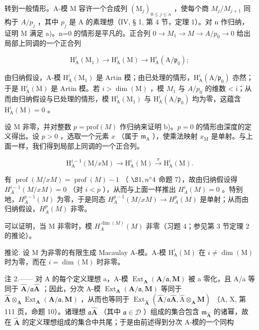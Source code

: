 转到一般情形。A-模 M 容许一个合成列 \((\mathrm{M}_{j})_{0\leqslant j\leqslant n}\) ，使每个商 \(M_{j}/M_{j+1}\) 同构于 \(A/p_{j}\) ，其中 \(p_{j}\) 是 A 的素理想（IV, § 1, 第 4 节，定理 1）。对 n 作归纳，证明 M 满足 a)。n=0 的情形是平凡的。正合列 \(0\to M_{1}\to M\to A/p_{0}\to0\) 给出局部上同调的一个正合列

\[
\mathrm{H} _ {\mathrm{A}} ^ {i} \left(\mathrm{M} _ {1}\right) \longrightarrow \mathrm{H} _ {\mathrm{A}} ^ {i} (\mathrm{M}) \longrightarrow \mathrm{H} _ {\mathrm{A}} ^ {i} \left(\mathrm{A} / \mathfrak {p} _ {0}\right);
\]

由归纳假设，A-模 \(\mathrm{H}_{\mathrm{A}}^{i}(\mathrm{M}_{1})\) 是 Artin 模；由已处理的情形，\(\mathrm{H}_{\mathrm{A}}^{i}(\mathrm{A}/\mathfrak{p}_{0})\) 亦然；于是 \(\mathrm{H}_{\mathrm{A}}^{i}(\mathrm{M})\) 是 Artin 模。若 \(i > \dim(\mathrm{M})\) ，模 \(M_{1}\) 与 \(A/p_{0}\) 的维数 < i；从而由归纳假设与已处理的情形，模 \(\mathrm{H}_{\mathrm{A}}^{i}(\mathrm{M}_{1})\) 与 \(\mathrm{H}_{\mathrm{A}}^{i}(\mathrm{A}/\mathfrak{p}_{0})\) 均为零，这蕴含 \(\mathrm{H}_{\mathrm{A}}^{i}(\mathrm{M}) = 0\) 。

设 M 非零，并对整数 \(p = \text{prof}(M)\) 作归纳来证明 b)。\(p = 0\) 的情形由深度的定义得出。设 \(p > 0\) ，选取一个元素 \(x\) （属于 \(\mathfrak{m}_{\mathrm{A}}\) ），使乘法映射 \(x_{\mathrm{M}}\) 是单射。与上面一样，我们得到局部上同调的一个正合列。

\[
\mathrm{H} _ {\mathrm{A}} ^ {i - 1} (\mathrm{M} / x \mathrm{M}) \longrightarrow \mathrm{H} _ {\mathrm{A}} ^ {i} (\mathrm{M}) \xrightarrow {x} \mathrm{H} _ {\mathrm{A}} ^ {i} (\mathrm{M}).
\]

有 \(\operatorname{prof}(M/xM) = \operatorname{prof}(M) - 1\) （ \(\S 1, n^{\circ} 4\) 命题 7），故由归纳假设得 \(H_{A}^{i-1}(M/xM) = 0\) （对 \(i < p\) ），从而与上面一样推出 \(H_{A}^{i}(M) = 0\) 。特别地，\(H_{A}^{p-1}(M)\) 为零，于是同态 \(H_{A}^{p-1}(M/xM) \longrightarrow H_{A}^{p}(M)\) 是单射；从而由归纳假设，\(H_{A}^{p}(M)\) 非零。

可以证明，当 M 非零时，模 \(H_{A}^{\dim(M)}(M)\) 非零（习题 4；参见第 3 节定理 2 的推论）。

推论. 设 M 为非零的有限生成 Macaulay A-模。A-模 \(\mathrm{H}_{\mathrm{A}}^{i}(\mathrm{M})\) 在 \(i \neq \dim(\mathrm{M})\) 时为零，而在 \(i = \dim(\mathrm{M})\) 时非零。

注 2.—— 对 A 的每个定义理想 a，A-模 \(\operatorname{Ext}_{\mathbf{A}}(\mathbf{A}/\mathfrak{a},\mathbf{M})\) 被 a 零化，且 A/a 等同于 \(\widehat{\mathbf{A}}/\mathfrak{a}\widehat{\mathbf{A}}\) ；因此，分次 A-模 \(\operatorname{Ext}_{\mathbf{A}}(\mathbf{A}/\mathfrak{a},\mathbf{M})\) 等同于 \(\widehat{\mathbf{A}}\otimes_{\mathbf{A}}\operatorname{Ext}_{\mathbf{A}}(\mathbf{A}/\mathfrak{a},\mathbf{M})\) ，从而也等同于 \(\operatorname{Ext}_{\widehat{\mathbf{A}}}(\widehat{\mathbf{A}}/\mathfrak{a}\widehat{\mathbf{A}},\widehat{\mathrm{A}}\otimes_{\mathbf{A}}\mathbf{M})\) （A, X, 第 111 页，命题 10）。诸理想 \(\mathfrak{a}\widehat{\mathbf{A}}\) （其中 \(\mathfrak{a}\in\mathcal{D}\) ）组成的集合包含 \(\mathfrak{m}_{\widehat{\mathbf{A}}}\) 的诸幂，故在 \(\widehat{\mathbf{A}}\) 的定义理想组成的集合中共尾；于是由前述得到分次 A-模的一个同构


